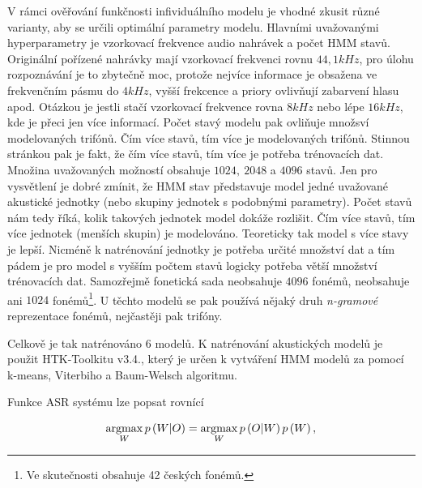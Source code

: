 V rámci ověřování funkčnosti infividuálního modelu je vhodné zkusit různé varianty, aby se určili optimální parametry modelu. Hlavními uvažovanými hyperparametry je vzorkovací frekvence audio nahrávek a počet HMM stavů. Originální pořízené nahrávky mají vzorkovací frekvenci rovnu $44,1 kHz$, pro úlohu rozpoznávání je to zbytečně moc, protože nejvíce informace je obsažena ve frekvenčním pásmu do $4 kHz$, vyšší frekcence a priory ovlivňují zabarvení hlasu apod. \cite{Psutka2006} Otázkou je jestli stačí vzorkovací frekvence rovna $8 kHz$ nebo lépe $16 kHz$, kde je přeci jen více informací. Počet stavý modelu pak ovliňuje množsví modelovaných trifónů. Čím více stavů, tím více je modelovaných trifónů. Stinnou stránkou pak je fakt, že čím více stavů, tím více  je potřeba trénovacích dat. Množina uvažovaných možností obsahuje $1024,\ 2048$ a $4096$ stavů. Jen pro vysvětlení je dobré zmínit, že HMM stav představuje model jedné uvažované akustické jednotky (nebo skupiny jednotek s podobnými parametry). Počet stavů nám tedy říká, kolik takových jednotek model dokáže rozlišit. Čím více stavů, tím více jednotek (menších skupin) je modelováno. Teoreticky tak model s více stavy je lepší. Nicméně k natrénování jednotky je potřeba určité množství dat a tím pádem je pro model s vyšším počtem stavů logicky potřeba větší množství trénovacích dat. Samozřejmě fonetická sada neobsahuje $4096$ fonémů, neobsahuje ani $1024$ fonémů\footnote{Ve skutečnosti obsahuje 42 českých fonémů.}. U těchto modelů se pak používá nějaký druh \textit{n-gramové} reprezentace fonémů, nejčastěji pak trifóny.

Celkově je tak natrénováno $6$ modelů. K natrénování akustických modelů je použit HTK-Toolkitu v3.4., který je určen k vytváření HMM modelů za pomocí k-means, Viterbiho a Baum-Welsch algoritmu.

Funkce ASR systému lze popsat rovnící

\begin{equation}
  \operatorname*{argmax}_W p\left(W | O\right) = \operatorname*{argmax}_W p\left(O | W\right) p\left(W\right),
\end{equation}

